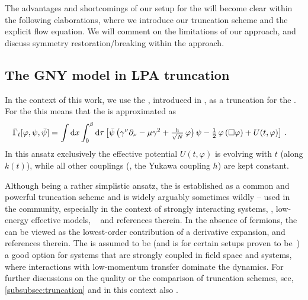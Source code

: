 The advantages and shortcomings of our \frg{} setup for the \gnym{} will become clear within the following elaborations, where we introduce our truncation scheme and the explicit \frg{} flow equation.
We will comment on the limitations of our approach, and discuss symmetry restoration/breaking within the \frg{} approach.

\subsection{The GNY model in LPA truncation}\label{subsec:gnyLPA}
In the context of this work, we use the , introduced in \deRef{}, as a truncation for the \frgEq{}. 
For the \gnym{} this means that the \eaa{} is approximated as
\begin{align}
	\bar{\Gamma}_t [\varphi ,\psi, \bar{\psi}] = \, & \int \dif x\int_{0}^{\beta}  \dif \tau \, \big[ \bar{\psi} \, \big( \gamma^\nu\partial_\nu - \mu \gamma^2 + \tfrac{h}{\sqrt{N}} \, \varphi \big) \, \psi - \tfrac{1}{2} \, \varphi \, ( \Box \varphi ) + U ( t, \varphi ) \big] \ .	\label{eq:gnyLPAansatz}
\end{align}
In this ansatz exclusively the \rgscaledependent{} effective potential $U ( t, \varphi )$ is evolving with \rgtime{} $t$ (along \rgscale{} $k ( t )$), while all other couplings (\eg{}, the Yukawa coupling $h$) are kept constant.

Although being a rather simplistic ansatz, the \lpa{} is established as a common and powerful truncation scheme and is widely \dash{} arguably sometimes wildly --	used in the \frg{} community, especially in the context of strongly interacting systems, \eg{}, low-energy effective models, \cf{}\  and references therein.
In the absence of fermions, the \lpa{} can be viewed as the lowest-order contribution of a derivative expansion, \cf{} \deRef{} and references therein.
The \lpa{} is assumed to be (and is for certain setups proven to be~\cite{DAttanasio:1997yph,Grossi:2019urj,Grossi:2021ksl,Koenigstein:2021syz,Koenigstein:2021rxj,Steil:2021cbu,Keitel:2011pn}) a good option for systems that are strongly coupled in field space and systems, where interactions with low-momentum transfer dominate the dynamics.
For further discussions on the quality or the comparison of truncation schemes, see, \cref{subsubsec:truncation} and in this context also .
	
